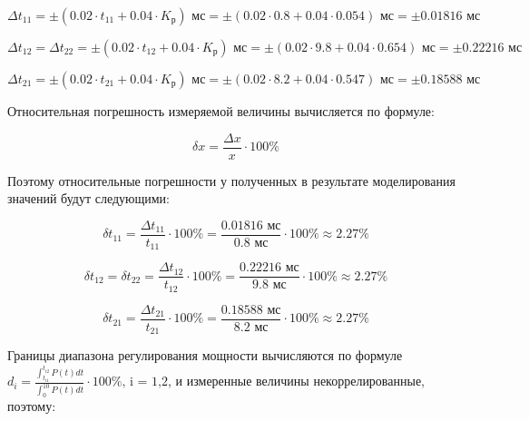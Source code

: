\begin{displaymath}
	\Delta t_{11} = \pm \left( 0.02 \cdot t_{11} + 0.04 \cdot K_{\text{р}} \right) \text{ мс} = \pm \left( 0.02 \cdot 0.8 + 0.04 \cdot 0.054 \right) \text{ мс} = \pm 0.01816 \text{ мс} 
\end{displaymath}

\begin{displaymath}
	\Delta t_{12} = \Delta t_{22} = \pm \left( 0.02 \cdot t_{12} + 0.04 \cdot K_{\text{р}} \right) \text{ мс} = \pm \left( 0.02 \cdot 9.8 + 0.04 \cdot 0.654 \right) \text{ мс} = \pm 0.22216 \text{ мс}
\end{displaymath}

\begin{displaymath}
	\Delta t_{21} = \pm \left( 0.02 \cdot t_{21} + 0.04 \cdot K_{\text{р}} \right) \text{ мс} = \pm \left( 0.02 \cdot 8.2 + 0.04 \cdot 0.547 \right) \text{ мс} = \pm 0.18588 \text{ мс}
\end{displaymath}

Относительная погрешность измеряемой величины вычисляется по формуле:

\begin{equation}
	\delta x = \frac{\Delta x}{x} \cdot 100\%
\end{equation}

Поэтому относительные погрешности у полученных в результате моделирования значений будут следующими:

\begin{displaymath}
	\delta t_{11} = \frac{\Delta t_{11}}{t_{11}} \cdot 100\% = \frac{0.01816 \text{ мс}}{0.8 \text{ мс}} \cdot 100\% \approx 2.27 \%
\end{displaymath}

\begin{displaymath}
	\delta t_{12} = \delta t_{22} = \frac{\Delta t_{12}}{t_{12}} \cdot 100\% = \frac{0.22216 \text{ мс}}{9.8 \text{ мс}} \cdot 100\% \approx 2.27 \%
\end{displaymath}

\begin{displaymath}
	\delta t_{21} = \frac{\Delta t_{21}}{t_{21}} \cdot 100\% = \frac{0.18588 \text{ мс}}{8.2 \text{ мс}} \cdot 100\% \approx 2.27 \%
\end{displaymath}

Границы диапазона регулирования мощности вычисляются по формуле\\\noindent $d_i = \frac{\int_{t_{i1}}^{t_{i2}} P(t) dt}{\int_{0}^{10} P(t) dt} \cdot 100\% \text{, i = 1,2}$, и измеренные величины некоррелированные, поэтому:

